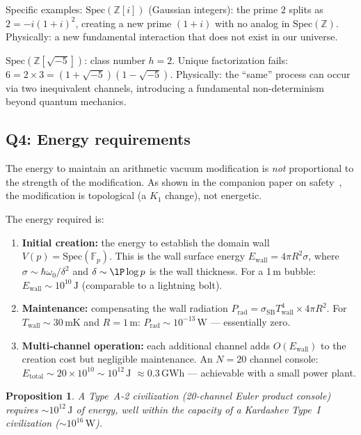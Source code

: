 \documentclass[11pt,a4paper]{article}
\newtheorem{proposition}[theorem]{Proposition}
\newcommand{\Spec}{\mathrm{Spec}}
\begin{document}
Specific examples:
$\Spec(\mathbb{Z}[i])$ (Gaussian integers): the prime $2$ splits
as $2 = -i(1+i)^2$, creating a new prime $(1+i)$ with no analog
in $\Spec(\mathbb{Z})$. Physically: a new fundamental interaction
that does not exist in our universe.

$\Spec(\mathbb{Z}[\sqrt{-5}])$: class number $h = 2$.
Unique factorization fails: $6 = 2 \times 3 = (1+\sqrt{-5})(1-\sqrt{-5})$.
Physically: the ``same'' process can occur via two inequivalent
channels, introducing a fundamental non-determinism beyond
quantum mechanics.

\subsection{Q4: Energy requirements}
\label{sec:energy}

The energy to maintain an arithmetic vacuum modification is
\emph{not} proportional to the strength of the modification.
As shown in the companion paper on safety~\cite{paper_J},
the modification is topological (a $K_1$ change), not energetic.

The energy required is:
\begin{enumerate}
\item \textbf{Initial creation:} the energy to establish the domain
  wall $V(p) = \Spec(\mathbb{F}_p)$. This is the wall surface
  energy $E_{\mathrm{wall}} = 4\pi R^2 \sigma$, where
  $\sigma \sim \hbar\omega_0 / \delta^2$ and
  $\delta \sim \lP \log p$ is the wall thickness.
  For a 1\,m bubble: $E_{\mathrm{wall}} \sim 10^{10}\,\mathrm{J}$
  (comparable to a lightning bolt).
\item \textbf{Maintenance:} compensating the wall radiation
  $P_{\mathrm{rad}} = \sigma_{\mathrm{SB}} T_{\mathrm{wall}}^4 \times 4\pi R^2$.
  For $T_{\mathrm{wall}} \sim 30\,\mathrm{mK}$ and $R = 1\,\mathrm{m}$:
  $P_{\mathrm{rad}} \sim 10^{-13}\,\mathrm{W}$ --- essentially zero.
\item \textbf{Multi-channel operation:} each additional channel adds
  $O(E_{\mathrm{wall}})$ to the creation cost but negligible
  maintenance. An $N = 20$ channel console:
  $E_{\mathrm{total}} \sim 20 \times 10^{10} \sim 10^{12}\,\mathrm{J}$
  $\approx 0.3\,\mathrm{GWh}$ --- achievable with a small power plant.
\end{enumerate}

\begin{proposition}
A Type~A-2 civilization (20-channel Euler product console) requires
$\sim 10^{12}\,\mathrm{J}$ of energy, well within the capacity of
a Kardashev Type~I civilization ($\sim 10^{16}\,\mathrm{W}$).
\end{proposition}
\end{document}
